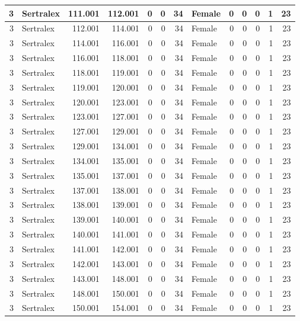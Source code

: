 \documentclass[
]{book}
\begin{document}
\begin{table}
\begin{tabular}[t]{r|l|r|r|r|r|r|l|r|r|r|r|r}
\hline
3 & Sertralex & 111.001 & 112.001 & 0 & 0 & 34 & Female & 0 & 0 & 0 & 1 & 23\\
\hline
3 & Sertralex & 112.001 & 114.001 & 0 & 0 & 34 & Female & 0 & 0 & 0 & 1 & 23\\
\hline
3 & Sertralex & 114.001 & 116.001 & 0 & 0 & 34 & Female & 0 & 0 & 0 & 1 & 23\\
\hline
3 & Sertralex & 116.001 & 118.001 & 0 & 0 & 34 & Female & 0 & 0 & 0 & 1 & 23\\
\hline
3 & Sertralex & 118.001 & 119.001 & 0 & 0 & 34 & Female & 0 & 0 & 0 & 1 & 23\\
\hline
3 & Sertralex & 119.001 & 120.001 & 0 & 0 & 34 & Female & 0 & 0 & 0 & 1 & 23\\
\hline
3 & Sertralex & 120.001 & 123.001 & 0 & 0 & 34 & Female & 0 & 0 & 0 & 1 & 23\\
\hline
3 & Sertralex & 123.001 & 127.001 & 0 & 0 & 34 & Female & 0 & 0 & 0 & 1 & 23\\
\hline
3 & Sertralex & 127.001 & 129.001 & 0 & 0 & 34 & Female & 0 & 0 & 0 & 1 & 23\\
\hline
3 & Sertralex & 129.001 & 134.001 & 0 & 0 & 34 & Female & 0 & 0 & 0 & 1 & 23\\
\hline
3 & Sertralex & 134.001 & 135.001 & 0 & 0 & 34 & Female & 0 & 0 & 0 & 1 & 23\\
\hline
3 & Sertralex & 135.001 & 137.001 & 0 & 0 & 34 & Female & 0 & 0 & 0 & 1 & 23\\
\hline
3 & Sertralex & 137.001 & 138.001 & 0 & 0 & 34 & Female & 0 & 0 & 0 & 1 & 23\\
\hline
3 & Sertralex & 138.001 & 139.001 & 0 & 0 & 34 & Female & 0 & 0 & 0 & 1 & 23\\
\hline
3 & Sertralex & 139.001 & 140.001 & 0 & 0 & 34 & Female & 0 & 0 & 0 & 1 & 23\\
\hline
3 & Sertralex & 140.001 & 141.001 & 0 & 0 & 34 & Female & 0 & 0 & 0 & 1 & 23\\
\hline
3 & Sertralex & 141.001 & 142.001 & 0 & 0 & 34 & Female & 0 & 0 & 0 & 1 & 23\\
\hline
3 & Sertralex & 142.001 & 143.001 & 0 & 0 & 34 & Female & 0 & 0 & 0 & 1 & 23\\
\hline
3 & Sertralex & 143.001 & 148.001 & 0 & 0 & 34 & Female & 0 & 0 & 0 & 1 & 23\\
\hline
3 & Sertralex & 148.001 & 150.001 & 0 & 0 & 34 & Female & 0 & 0 & 0 & 1 & 23\\
\hline
3 & Sertralex & 150.001 & 154.001 & 0 & 0 & 34 & Female & 0 & 0 & 0 & 1 & 23\\

\end{tabular}
\end{table}
\end{document}
